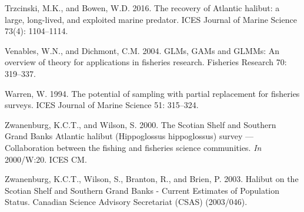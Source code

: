 \documentclass[12pt]{article}\usepackage[]{graphicx}\usepackage[]{color}
\begin{document}
\leavevmode\hypertarget{ref-Trzcinski2016}{}%
Trzcinski, M.K., and Bowen, W.D. 2016. The recovery of Atlantic halibut: a large, long-lived, and exploited marine predator. ICES Journal of Marine Science 73(4): 1104--1114.

\leavevmode\hypertarget{ref-Venables2004}{}%
Venables, W.N., and Dichmont, C.M. 2004. GLMs, GAMs and GLMMs: An overview of theory for applications in fisheries research. Fisheries Research 70: 319--337.

\leavevmode\hypertarget{ref-Warren1994}{}%
Warren, W. 1994. The potential of sampling with partial replacement for fisheries surveys. ICES Journal of Marine Science 51: 315--324.

\leavevmode\hypertarget{ref-Zwanenburg2000}{}%
Zwanenburg, K.C.T., and Wilson, S. 2000. The Scotian Shelf and Southern Grand Banks Atlantic halibut (Hippoglossus hippoglossus) survey --- Collaboration between the fishing and fisheries science communities. \emph{In} 2000/W:20. ICES CM.

\leavevmode\hypertarget{ref-Zwanenburg2003}{}%
Zwanenburg, K.C.T., Wilson, S., Branton, R., and Brien, P. 2003. Halibut on the Scotian Shelf and Southern Grand Banks - Current Estimates of Population Status. Canadian Science Advisory Secretariat (CSAS) (2003/046).
\end{document}
